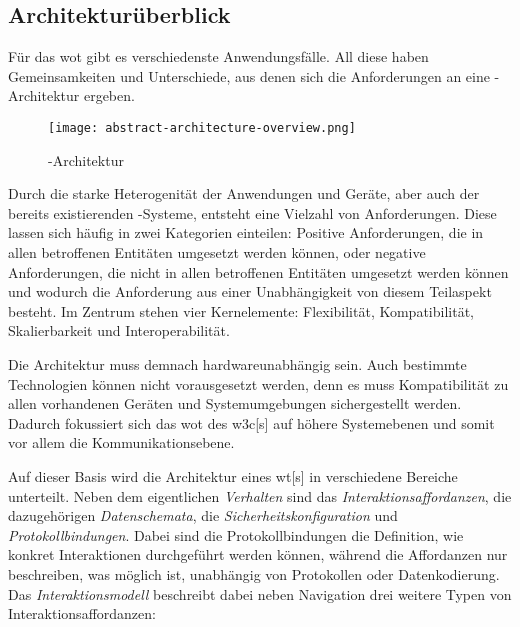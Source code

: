 \subsection{Architekturüberblick}\label{subsec:wotarchitecture}

Für das \gls{wot} gibt es verschiedenste Anwendungsfälle. All diese haben Gemeinsamkeiten und Unterschiede, aus denen sich die Anforderungen an eine -Architektur \autocite[vgl.][]{w3c.wot.architecture.20200408} ergeben.

\begin{figure}[H]
  \centering
  \texttt{[image: abstract-architecture-overview.png]}
  \caption{-Architektur}\label{fig:wot_abstract_architecture}
\end{figure}


Durch die starke Heterogenität der Anwendungen und Geräte, aber auch der bereits existierenden -Systeme, entsteht eine Vielzahl von Anforderungen. Diese lassen sich häufig in zwei Kategorien einteilen: Positive Anforderungen, die in allen betroffenen Entitäten umgesetzt werden können, oder negative Anforderungen, die nicht in allen betroffenen Entitäten umgesetzt werden können und wodurch die Anforderung aus einer Unabhängigkeit von diesem Teilaspekt besteht. Im Zentrum stehen vier Kernelemente: Flexibilität, Kompatibilität, Skalierbarkeit und Interoperabilität.


Die Architektur muss demnach hardwareunabhängig sein. Auch bestimmte Technologien können nicht vorausgesetzt werden, denn es muss Kompatibilität zu allen vorhandenen Geräten und Systemumgebungen sichergestellt werden. Dadurch fokussiert sich das \gls{wot} des \gls{w3c}[s] auf höhere Systemebenen und somit vor allem die Kommunikationsebene.


Auf dieser Basis wird die Architektur eines \gls{wt}[s] in verschiedene Bereiche unterteilt. Neben dem eigentlichen \emph{Verhalten} sind das \emph{Interaktionsaffordanzen}, die dazugehörigen \emph{Datenschemata}, die \emph{Sicherheitskonfiguration} und \emph{Protokollbindungen}. Dabei sind die Protokollbindungen die Definition, wie konkret Interaktionen durchgeführt werden können, während die Affordanzen nur beschreiben, was möglich ist, unabhängig von Protokollen oder Datenkodierung. Das \emph{Interaktionsmodell} beschreibt dabei neben Navigation drei weitere Typen von Interaktionsaffordanzen:

